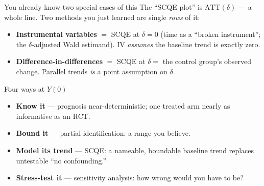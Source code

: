 \documentclass[xcolor=dvipsnames]{beamer}
\newcommand\makebiggaps{\addtolength{\itemsep}{.5\baselineskip}}
\newcommand\YY{Y(0)}                    %
\newcommand\ATT{\text{ATT}}
\begin{document}
\begin{frame}{You already know two special cases of this}
\small
The ``SCQE plot'' is $\ATT(\delta)$ --- a whole line. Two methods you just learned
are single \emph{rows} of it:
\begin{itemize}\makebiggaps
\item \textbf{Instrumental variables} $=$ SCQE at $\delta = 0$ (time as a ``broken
      instrument''; the $\delta$-adjusted Wald estimand). IV \emph{assumes} the
      baseline trend is exactly zero.
\item \textbf{Difference-in-differences} $=$ SCQE at $\delta = $ the control group's
      observed change. Parallel trends \emph{is} a point assumption on $\delta$.
\end{itemize}
\vfill
{}
\end{frame}

\begin{frame}{Four ways at $\YY$}
\begin{itemize}\makebiggaps
\item \textbf{Know it} --- prognosis near-deterministic; one treated arm nearly as
      informative as an RCT.
\item \textbf{Bound it} --- partial identification: a range you believe.
\item \textbf{Model its trend} --- SCQE: a nameable, boundable baseline trend
      replaces untestable ``no confounding.''
\item \textbf{Stress-test it} --- sensitivity analysis: how wrong would you have to be?
\end{itemize}
\end{frame}
\end{document}
